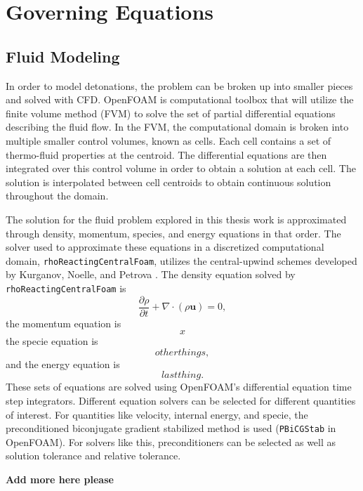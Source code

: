 \chapter{Governing Equations}
\label{math}

\section{Fluid Modeling}
In order to model detonations, the problem can be broken up into smaller pieces and solved with CFD. OpenFOAM is computational toolbox that will utilize the finite volume method (FVM) to solve the set of partial differential equations describing the fluid flow. In the FVM, the computational domain is broken into multiple smaller control volumes, known as cells. Each cell contains a set of thermo-fluid properties at the centroid. The differential equations are then integrated over this control volume in order to obtain a solution at each cell. The solution is interpolated between cell centroids to obtain continuous solution throughout the domain. 

The solution for the fluid problem explored in this thesis work is approximated through density, momentum, species, and energy equations in that order. The solver used to approximate these equations in a discretized computational domain, \verb|rhoReactingCentralFoam|, utilizes the central-upwind schemes developed by Kurganov, Noelle, and Petrova \cite{kurganov}. The density equation solved by \verb|rhoReactingCentralFoam| is
\begin{equation}
\frac{\partial \rho}{\partial t} + \nabla \cdot \left(\rho \bm{u}\right) = 0,
\end{equation}
the momentum equation is
\begin{equation}
x
\end{equation}
the specie equation is
\[other things,\]
and the energy equation is
\[last thing.\]
These sets of equations are solved using OpenFOAM's differential equation time step integrators. Different equation solvers can be selected for different quantities of interest. For quantities like velocity, internal energy, and specie, the preconditioned biconjugate gradient stabilized method is used (\verb|PBiCGStab| in OpenFOAM). For solvers like this, preconditioners can be selected as well as solution tolerance and relative tolerance. 

\textbf{\color{red} Add more here please}


